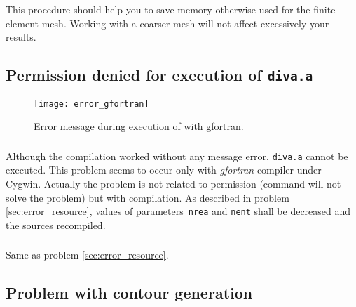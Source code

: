 This procedure should help you to save memory otherwise used for the finite-element mesh. Working with a coarser mesh will not affect excessively your results.





\subsection{Permission denied for execution of \texttt{diva.a}\label{sec:error_gfortran}}


\begin{figure}[htpb]
\centering
\texttt{[image: error\_gfortran]}
\caption{Error message during execution of  with gfortran\label{fig:error_gfortran}.}
\end{figure}

\subsubsection{\question}

Although the compilation worked without any message error, \texttt{diva.a} cannot be executed. This problem seems to occur only with \textsl{gfortran} compiler under \textsf{Cygwin}. Actually the problem is not related to permission (command  will not solve the problem) but with compilation. As described in problem \ref{sec:error_resource}, values of parameters\, \texttt{nrea} and \texttt{nent} shall be decreased and the sources recompiled.

\subsubsection{\answer}

Same as problem \ref{sec:error_resource}. 




\subsection{Problem with contour generation}

